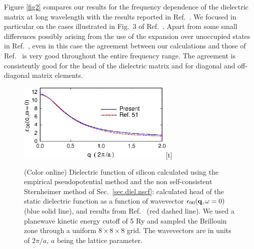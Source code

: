 \documentclass[twocolumn,prb,showpacs,superscriptaddress]{revtex4}
\def\w{\omega}
\def\q{{\bf q}}
\begin{document}
Figure \ref{fig2} compares our results for the frequency dependence of the dielectric matrix
at long wavelength with the results reported in Ref.\ . 
We focused in particular on the cases illustrated in Fig.\ 3 of Ref.\ .
Apart from some small differences possibly arising from the use of the expansion over unoccupied
states in Ref.\ , even in this case the agreement between our calculations 
and those of Ref.\  is very good throughout the entire frequency range.
The agreement is consistently good for the head of the dielectric matrix and for
diagonal and off-diagonal matrix elements.

\begin  {figure}
\begin  {center}
\includegraphics[width=7.5cm]{fig1.eps}[t]
\end    {center}
\caption{\label{fig1}
        (Color online)
        Dielectric function of silicon calculated using the empirical pseudopotential method and the
        non self-consistent Sternheimer method of Sec.\ \ref{sec.diel.nscf}:
        calculated head of the static dielectric function as a function of wavevector $\epsilon_{00}(\q,\w=0)$ (blue solid line),
        and results from Ref.\  (red dashed line). We used a planewave kinetic energy cutoff of 5 Ry
        and sampled the Brillouin zone through a uniform $8\times 8\times 8$ grid.
        The wavevectors are in units of $2\pi/a$, $a$ being the lattice parameter.
        }
\end    {figure}
\end{document}
